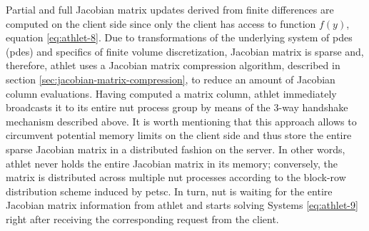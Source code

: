 Partial and full Jacobian matrix updates derived from finite differences are computed on the client side since only the client has access to function $f(y)$, equation \ref{eq:athlet-8}. Due to transformations of the underlying system of \acrlong{pde}s (\acrshort{pde}s) and specifics of finite volume discretization, Jacobian matrix is sparse and, therefore, \acrshort{athlet} uses a Jacobian matrix compression algorithm, described in section \ref{sec:jacobian-matrix-compression}, to reduce an amount of Jacobian column evaluations. Having computed a matrix column, \acrshort{athlet} immediately broadcasts it to its entire \acrshort{nut} process group by means of the 3-way handshake mechanism described above. It is worth mentioning that this approach allows to circumvent potential memory limits on the client side and thus store the entire sparse Jacobian matrix in a distributed fashion on the server. In other words, \acrshort{athlet} never holds the entire Jacobian matrix in its memory; conversely, the matrix is distributed across multiple \acrshort{nut} processes according to the block-row distribution scheme induced by \acrshort{petsc}. In turn, \acrshort{nut} is waiting for the entire Jacobian matrix information from \acrshort{athlet} and starts solving Systems \ref{eq:athlet-9} right after receiving the corresponding request from the client.\\


